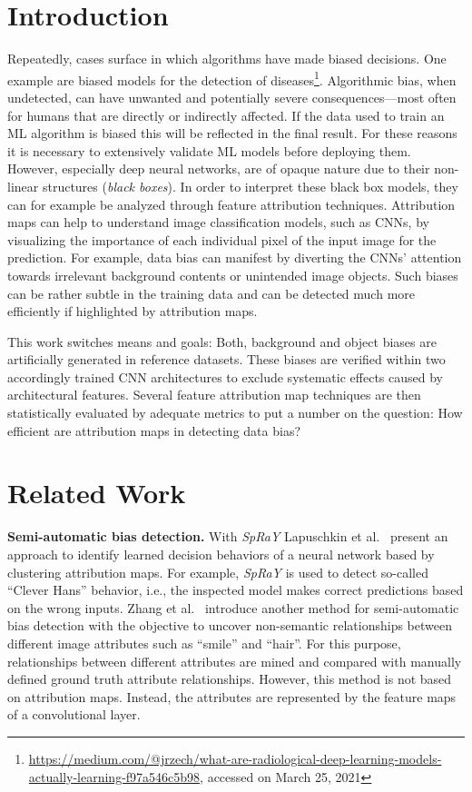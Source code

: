 \documentclass[runningheads]{llncs}
\begin{document}
\section{Introduction}

Repeatedly, cases surface in which algorithms have made biased decisions. One example are biased models for the detection of diseases\footnote{\url{https://medium.com/@jrzech/what-are-radiological-deep-learning-models-actually-learning-f97a546c5b98}, accessed on March 25, 2021}. Algorithmic bias, when undetected, can have unwanted and potentially severe consequences---most often for humans that are directly or indirectly affected.
If the data used to train an ML algorithm is biased this will be reflected in the final result. For these reasons it is necessary to extensively validate ML models before deploying them. However, especially deep neural networks, are of opaque nature due to their non-linear structures (\emph{black boxes}).
In order to interpret these black box models, they can for example be analyzed through feature attribution techniques. Attribution maps can help to understand image classification models, such as CNNs, by visualizing the importance of each individual pixel of the input image for the prediction. For example, data bias can manifest by diverting the CNNs' attention towards irrelevant background contents or unintended image objects. Such biases can be rather subtle in the training data and can be detected much more efficiently if highlighted by attribution maps.

This work switches means and goals: Both, background and object biases are artificially generated in reference datasets. These biases are verified within two accordingly trained CNN architectures to exclude systematic effects caused by architectural features. Several feature attribution map techniques are then statistically evaluated by adequate metrics to put a number on the question: How efficient are attribution maps in detecting data bias?

\section{Related Work}

\textbf{Semi-automatic bias detection.} With \emph{SpRaY} Lapuschkin et al.~\cite{Lapuschkin.2019} present an approach to identify learned decision behaviors of a neural network based by clustering attribution maps. For example, \emph{SpRaY} is used to detect so-called \enquote{Clever Hans} behavior, i.e., the inspected model makes correct predictions based on the wrong inputs. Zhang et al.~\cite{QuanshiZhang.2018} introduce another method for semi-automatic bias detection with the objective to uncover non-semantic relationships between different image attributes such as \enquote{smile} and \enquote{hair}. For this purpose, relationships between different attributes are mined and compared with manually defined ground truth attribute relationships. However, this method is not based on attribution maps. Instead, the attributes are represented by the feature maps of a convolutional layer.
\end{document}
